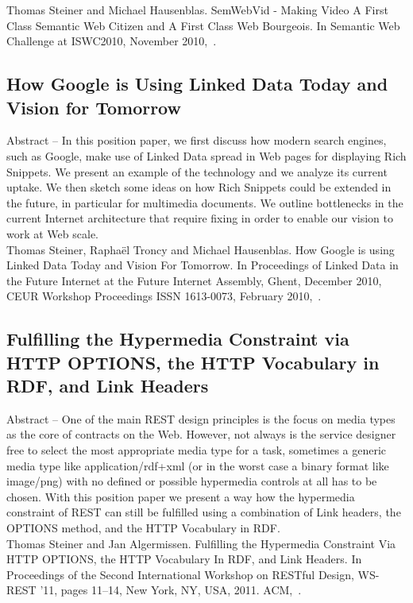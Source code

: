 \documentclass[12pt]{article}
\begin{document}
\noindent Thomas Steiner and Michael Hausenblas. SemWebVid - Making Video A First Class Semantic Web Citizen and A First Class Web Bourgeois. In Semantic Web Challenge at ISWC2010, November 2010,~\cite{semwebvidswc}.\\

\subsection{How Google is Using Linked Data Today and Vision for Tomorrow}
Abstract -- In this position paper, we first discuss how modern search engines, such as Google, make use of Linked Data spread in Web pages for displaying Rich Snippets. We present an example of the technology and we analyze its current uptake. We then sketch some ideas on how Rich Snippets could be extended in the future, in particular for multimedia documents. We outline bottlenecks in the current Internet architecture that require fixing in order to enable our vision to work at Web scale.\\

\noindent Thomas Steiner, Rapha{\"e}l Troncy and Michael Hausenblas. How Google is using Linked Data Today and Vision For Tomorrow. In Proceedings of Linked Data in the Future Internet at the Future Internet Assembly, Ghent, December 2010, CEUR Workshop Proceedings ISSN 1613-0073, February 2010,~\cite{CEUR-WS.org/Vol-700/Paper5}.\\

\subsection{Fulfilling the Hypermedia Constraint via HTTP OPTIONS, the HTTP Vocabulary in RDF, and Link Headers}
Abstract -- One of the main REST design principles is the focus on media types as the core of contracts on the Web. However, not always is the service designer free to select the most appropriate media type for a task, sometimes a generic media type like application/rdf+xml (or in the worst case a binary format like image/png) with no defined or possible hypermedia controls at all has to be chosen. With this position paper we present a way how the hypermedia constraint of REST can still be fulfilled using a combination of Link headers, the OPTIONS method, and the HTTP Vocabulary in RDF.\\

\noindent Thomas Steiner and Jan Algermissen. Fulfilling the Hypermedia Constraint Via HTTP OPTIONS, the HTTP Vocabulary In RDF, and Link Headers. In Proceedings of the Second International Workshop on RESTful Design, WS-REST ’11, pages 11–14, New York, NY, USA, 2011. ACM,~\cite{Steiner:2011:FHC:1967428.1967433}.\\
\end{document}
